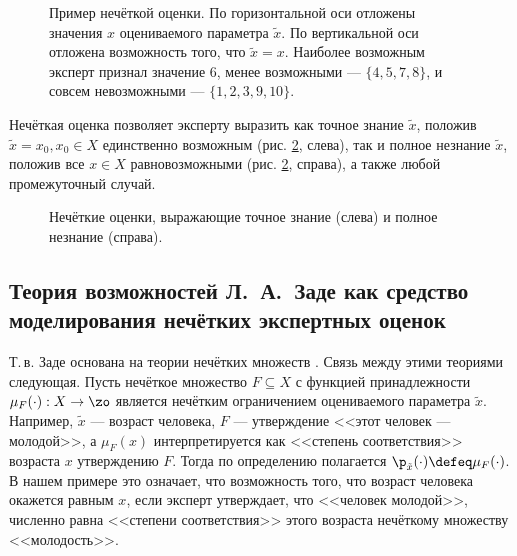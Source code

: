 \begin{figure}[h]
\caption{\small Пример нечёткой оценки. По горизонтальной оси отложены значения $x$ оцениваемого параметра $\tilde x$. По вертикальной оси отложена возможность того, что $\tilde x = x$. Наиболее возможным эксперт признал значение $6$, менее возможными ---  $\{4,5,7,8\}$, и совсем невозможными --- $\{1,2,3,9,10\}$.}
\label{ris:fuzzy_ass00}
\end{figure}

Нечёткая оценка позволяет эксперту выразить как точное знание $\tilde x$, положив $\tilde x = x_0, x_0 \in X$ единственно возможным (рис. \ref{ris:fuzzy_ass01}, слева), так и полное незнание $\tilde x$, положив все $x \in X$ равновозможными (рис. \ref{ris:fuzzy_ass01}, справа), а также любой промежуточный случай.

\begin{figure}[h]
\caption{\small Нечёткие оценки, выражающие точное знание (слева) и полное незнание (справа). }
\label{ris:fuzzy_ass01}
\end{figure}

\subsection{Теория возможностей Л.~А.~Заде как средство моделирования нечётких экспертных оценок}

Т.\,в. Заде основана на теории нечётких множеств \cite{5,6}. Связь между этими теориями следующая. Пусть нечёткое множество $F \subseteq X$ с функцией принадлежности $\mu_{F}(\cdot): X \rightarrow \zo$ является нечётким ограничением \cite{3} оцениваемого параметра $\tilde x$. Например, $\tilde x$ --- возраст человека, $F$ --- утверждение <<этот человек --- молодой>>, а $\mu_{F}(x)$ интерпретируется как <<степень соответствия>> возраста $x$ утверждению $F$. Тогда по определению полагается $\p_{\tilde x}(\cdot) \defeq \mu_{F}(\cdot)$. В нашем примере это означает, что возможность того, что возраст человека окажется равным $x$, если эксперт утверждает, что <<человек молодой>>, численно равна <<степени соответствия>> этого возраста нечёткому множеству <<молодость>>. 

